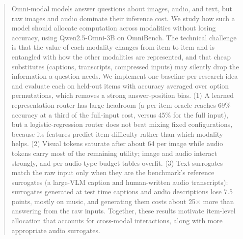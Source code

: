 \documentclass{article}
\begin{document}

\printAffiliationsAndNotice{}

\begin{abstract}
Omni-modal models answer questions about images, audio, and text, but raw images
and audio dominate their inference cost. We study how such a model should
allocate computation across modalities without losing accuracy, using
Qwen2.5-Omni-3B on OmniBench. The technical challenge is that the value of each
modality changes from item to item and is entangled with how the other modalities
are represented, and that cheap substitutes (captions, transcripts, compressed
inputs) may silently drop the information a question needs. We implement one
baseline per research idea and evaluate each on held-out items with accuracy
averaged over option permutations, which removes a strong answer-position bias.
(1) A learned representation router has large headroom (a per-item oracle reaches
69\% accuracy at a third of the full-input cost, versus 45\% for the full input),
but a logistic-regression router does not beat mixing fixed configurations,
because its features predict item difficulty rather than which modality helps.
(2) Visual tokens saturate after about 64 per image while audio tokens carry most
of the remaining utility; image and audio interact strongly, and per-audio-type
budget tables overfit. (3) Text surrogates match the raw input only when they are
the benchmark's reference surrogates (a large-VLM caption and human-written audio
transcripts): surrogates generated at test time captions and audio descriptions lose 7.5 points,
mostly on music, and generating them costs about 25$\times$ more than answering from
the raw inputs. Together, these results motivate item-level allocation that accounts for cross-modal interactions, along with more appropriate audio surrogates.
\end{abstract}
\end{document}
